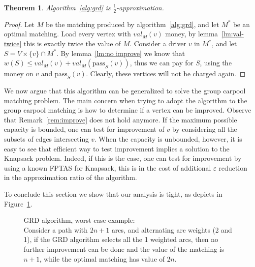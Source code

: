 \documentclass[draft]{article}
\newtheorem{theorem}{Theorem}
\begin{document}
\begin{theorem}
Algorithm~\ref{alg:grd} is $\frac{1}{2}$-approximation.
\end{theorem}

\begin{proof}
Let $M$ be the matching produced by algorithm~\ref{alg:grd}, 
and let $M^*$ be an optimal matching.
Load every vertex with $val_M(v)$ money, 
by lemma~\ref{lm:val-twice} this is exactly twice the value of $M$.
Consider a driver $v$ in $M^*$, and let $S = V \times \{v\} \cap M^*$.
By lemma~\ref{lm:no improve} we know that $w(S) \leq val_M(v) + val_M(\text{pass}_S(v))$,
thus we can pay for $S$, using the money on $v$ and $\text{pass}_S(v)$.
Clearly, these vertices will not be charged again.
\end{proof}

We now argue that this algorithm can be generalized to solve the group carpool
matching problem.
The main concern when trying to adopt the algorithm to the group carpool
matching is how to determine if a vertex can be improved.
Observe that Remark~\ref{rem:improve} does not hold anymore.
If the maximum possible capacity is bounded, one can test for improvement of
$v$ by considering all the subsets of edges intersecting $v$. 
When the capacity is unbounded, however, it is easy to see that efficient
way to test improvement implies a solution to the Knapsack problem.
Indeed, if this is the case, one can test for improvement by using a known FPTAS
for Knapsack, this is in the cost of additional $\varepsilon$ reduction in the
approximation ratio of the algorithm.

To conclude this section we show that our analysis is tight, 
as depicts in Figure~\ref{fig:grd worst}.
\begin{figure}
\centering
{}
\caption[]{
\label{fig:grd worst}
GRD algorithm, worst case example: \\
Consider a path with $2n + 1$ arcs,
and alternating arc weights (2 and 1),
if the GRD algorithm selects all the 1 weighted arcs,
then no further improvement can be done and the value of the matching is $n + 1$,
while the optimal matching has value of $2n$.
}
\end{figure}



\end{document}
